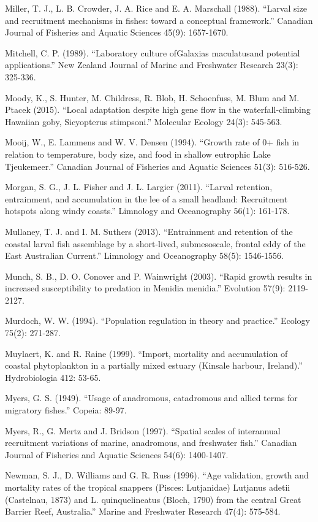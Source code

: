 \documentclass[]{book}
\begin{document}
Miller, T. J., L. B. Crowder, J. A. Rice and E. A. Marschall (1988).
``Larval size and recruitment mechanisms in fishes: toward a conceptual
framework.'' Canadian Journal of Fisheries and Aquatic Sciences 45(9):
1657-1670.

Mitchell, C. P. (1989). ``Laboratory culture ofGalaxias maculatusand
potential applications.'' New Zealand Journal of Marine and Freshwater
Research 23(3): 325-336.

Moody, K., S. Hunter, M. Childress, R. Blob, H. Schoenfuss, M. Blum and
M. Ptacek (2015). ``Local adaptation despite high gene flow in the
waterfall‐climbing Hawaiian goby, Sicyopterus stimpsoni.'' Molecular
Ecology 24(3): 545-563.

Mooij, W., E. Lammens and W. V. Densen (1994). ``Growth rate of 0+ fish
in relation to temperature, body size, and food in shallow eutrophic
Lake Tjeukemeer.'' Canadian Journal of Fisheries and Aquatic Sciences
51(3): 516-526.

Morgan, S. G., J. L. Fisher and J. L. Largier (2011). ``Larval
retention, entrainment, and accumulation in the lee of a small headland:
Recruitment hotspots along windy coasts.'' Limnology and Oceanography
56(1): 161-178.

Mullaney, T. J. and I. M. Suthers (2013). ``Entrainment and retention of
the coastal larval fish assemblage by a short-lived, submesoscale,
frontal eddy of the East Australian Current.'' Limnology and
Oceanography 58(5): 1546-1556.

Munch, S. B., D. O. Conover and P. Wainwright (2003). ``Rapid growth
results in increased susceptibility to predation in Menidia menidia.''
Evolution 57(9): 2119-2127.

Murdoch, W. W. (1994). ``Population regulation in theory and practice.''
Ecology 75(2): 271-287.

Muylaert, K. and R. Raine (1999). ``Import, mortality and accumulation
of coastal phytoplankton in a partially mixed estuary (Kinsale harbour,
Ireland).'' Hydrobiologia 412: 53-65.

Myers, G. S. (1949). ``Usage of anadromous, catadromous and allied terms
for migratory fishes.'' Copeia: 89-97.

Myers, R., G. Mertz and J. Bridson (1997). ``Spatial scales of
interannual recruitment variations of marine, anadromous, and freshwater
fish.'' Canadian Journal of Fisheries and Aquatic Sciences 54(6):
1400-1407.

Newman, S. J., D. Williams and G. R. Russ (1996). ``Age validation,
growth and mortality rates of the tropical snappers (Pisces: Lutjanidae)
Lutjanus adetii (Castelnau, 1873) and L. quinquelineatus (Bloch, 1790)
from the central Great Barrier Reef, Australia.'' Marine and Freshwater
Research 47(4): 575-584.
\end{document}
